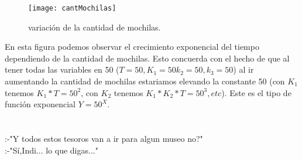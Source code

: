 \documentclass[spanish,12pt]{article}
\begin{document}
\begin{figure}[H]
\centering
\texttt{[image: cantMochilas]}
\caption{variación de la cantidad de mochilas.}
\end{figure}

En esta figura podemos observar el crecimiento exponencial del tiempo dependiendo de la cantidad de mochilas. Esto concuerda con el hecho de que al tener todas las variables en 50 ($T=50, K_1 =50 k_2=50, k_3=50$) al ir aumentando la cantidad de mochilas estariamos elevando la constante 50 (con $K_1$ tenemos $K_1*T=50^2$, con $K_2$ tenemos $K_1*K_2*T=50^3, etc $). Este es el tipo de función exponencial $Y=50^X$.
\\
\\
\\






:-"Y todos estos tesoros van a ir para algun museo no?"
\\
:-"Sí,Indi... lo que digas..."
\end{document}
